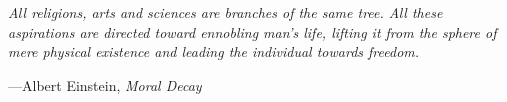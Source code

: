 \documentclass[letterpaper, 11pt]{book}
\theoremstyle{definition}
\theoremstyle{remark}
\begin{document}
\vspace*{\fill}



\pagebreak
\clearpage\thispagestyle{empty}\mbox{}\clearpage


\thispagestyle{empty}
\vspace*{5em}
\epigraph{\itshape All religions, arts and sciences are branches of the same tree. All these aspirations are directed toward ennobling man's life, lifting it from the sphere of mere physical existence and leading the individual towards freedom.}{---Albert Einstein, \textit{Moral Decay}}




\tableofcontents
\end{document}
